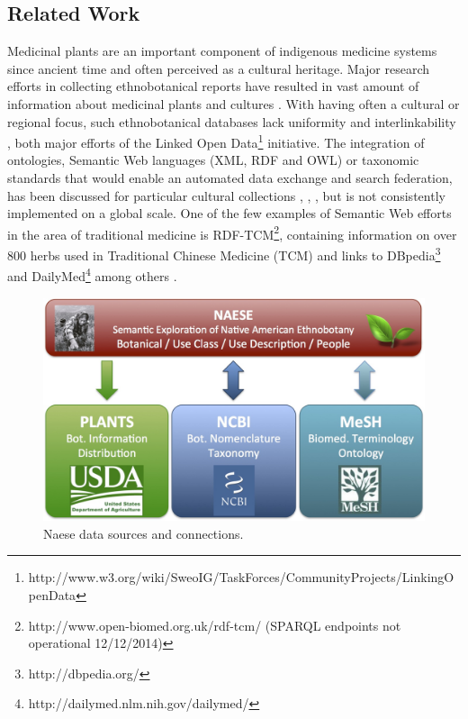 \documentclass{acm_proc_article-sp}
\begin{document}
\subsection{Related Work}
Medicinal plants are an important component of indigenous medicine systems since ancient time and often perceived as a cultural heritage. Major research efforts in collecting ethnobotanical reports have resulted in vast amount of information about medicinal plants and cultures \cite{Heinrich:2006}. With having often a cultural or regional focus, such ethnobotanical databases lack uniformity and interlinkability \cite{Ningthoujam:2012}, both major efforts of the Linked Open Data\footnote{http://www.w3.org/wiki/SweoIG/TaskForces/CommunityProjects/LinkingOpenData} initiative. The integration of ontologies, Semantic Web languages (XML, RDF and OWL) or taxonomic standards that would enable an automated data exchange and search federation, has been discussed for particular cultural collections \cite{KamsuFoguem:2013}, \cite{Mustaffa:2012}, \cite{Zhou:2004}, but is not consistently implemented on a global scale. One of the few examples of Semantic Web efforts in the area of traditional medicine is RDF-TCM\footnote{http://www.open-biomed.org.uk/rdf-tcm/ (SPARQL endpoints not operational 12/12/2014)}, containing information on over 800 herbs used in Traditional Chinese Medicine (TCM) and links to  DBpedia\footnote{http://dbpedia.org/} and DailyMed\footnote{http://dailymed.nlm.nih.gov/dailymed/} among others \cite{zhao:2010}. 

\begin{figure}
	\includegraphics[width=\linewidth]{NAESE_architecture}
	\caption{Naese data sources and connections.}
	\label{fig:NaeseSources}
\end{figure}
\end{document}
